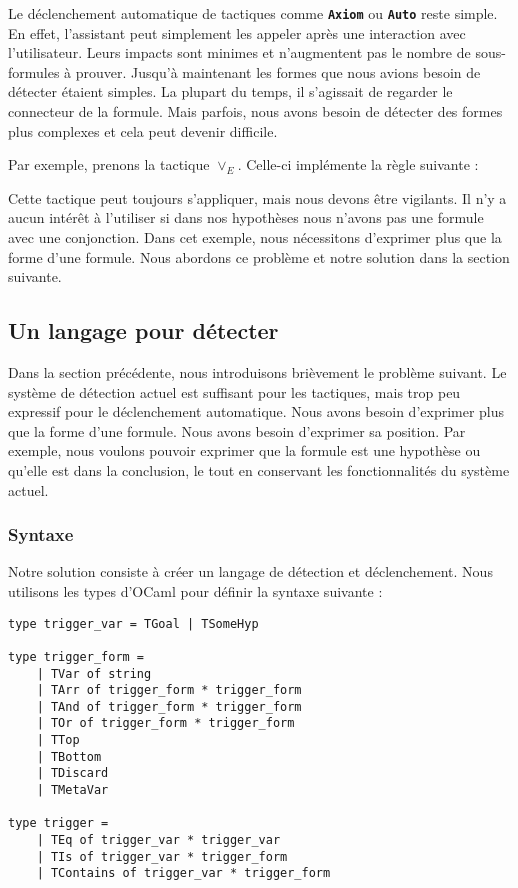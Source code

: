 \documentclass[french,titlepage]{article}
\newcommand{\textttbf}[1]{\texttt{\textbf{#1}}}
\begin{document}
Le déclenchement automatique de tactiques comme \textttbf{Axiom} ou \textttbf{Auto} reste simple. En effet, l'assistant peut simplement les appeler après une interaction avec l'utilisateur. Leurs impacts sont minimes et n'augmentent pas le nombre de sous-formules à prouver. Jusqu'à maintenant les formes que nous avions besoin de détecter étaient simples. La plupart du temps, il s'agissait de regarder le connecteur de la formule.
Mais parfois, nous avons besoin de détecter des formes plus complexes et cela peut devenir difficile.

Par exemple, prenons la tactique $\lor_E$. Celle-ci implémente la règle suivante :
\begin{mathpar}
\end{mathpar}
Cette tactique peut toujours s'appliquer, mais nous devons être vigilants. Il n'y a aucun intérêt à l'utiliser si dans nos hypothèses nous n'avons pas une formule avec une conjonction. Dans cet exemple, nous nécessitons d'exprimer plus que la forme d'une formule. Nous abordons ce problème et notre solution dans la section suivante.

\subsection{Un langage pour détecter} \label{realisation:langage_detecter}
Dans la section précédente, nous introduisons brièvement le problème suivant. Le système de détection actuel est suffisant pour les tactiques, mais trop peu expressif pour le déclenchement automatique. Nous avons besoin d'exprimer plus que la forme d'une formule. Nous avons besoin d'exprimer sa position. Par exemple, nous voulons pouvoir exprimer que la formule est une hypothèse ou qu'elle est dans la conclusion, le tout en conservant les fonctionnalités du système actuel.

\subsubsection{Syntaxe} \label{realisation:langage_detecter:syntaxe}
Notre solution consiste à créer un langage de détection et déclenchement. Nous utilisons les types d'OCaml pour définir la syntaxe suivante :
\begin{verbatim}
type trigger_var = TGoal | TSomeHyp

type trigger_form =
    | TVar of string
    | TArr of trigger_form * trigger_form
    | TAnd of trigger_form * trigger_form
    | TOr of trigger_form * trigger_form
    | TTop
    | TBottom
    | TDiscard
    | TMetaVar

type trigger =
    | TEq of trigger_var * trigger_var
    | TIs of trigger_var * trigger_form
    | TContains of trigger_var * trigger_form
\end{verbatim}
\end{document}
